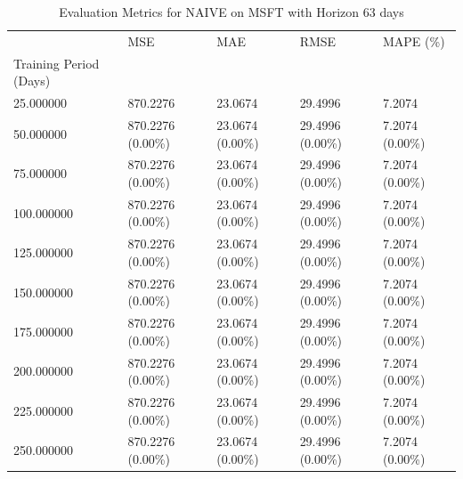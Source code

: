 \begin{table}
\caption{Evaluation Metrics for NAIVE on MSFT with Horizon 63 days}
\label{tab:naive_MSFT_h63_metrics}
\begin{tabular}{lllll}
\toprule
 & MSE & MAE & RMSE & MAPE (\%) \\
Training Period (Days) &  &  &  &  \\
\midrule
25.000000 & 870.2276 & 23.0674 & 29.4996 & 7.2074 \\
50.000000 & 870.2276 (0.00\%) & 23.0674 (0.00\%) & 29.4996 (0.00\%) & 7.2074 (0.00\%) \\
75.000000 & 870.2276 (0.00\%) & 23.0674 (0.00\%) & 29.4996 (0.00\%) & 7.2074 (0.00\%) \\
100.000000 & 870.2276 (0.00\%) & 23.0674 (0.00\%) & 29.4996 (0.00\%) & 7.2074 (0.00\%) \\
125.000000 & 870.2276 (0.00\%) & 23.0674 (0.00\%) & 29.4996 (0.00\%) & 7.2074 (0.00\%) \\
150.000000 & 870.2276 (0.00\%) & 23.0674 (0.00\%) & 29.4996 (0.00\%) & 7.2074 (0.00\%) \\
175.000000 & 870.2276 (0.00\%) & 23.0674 (0.00\%) & 29.4996 (0.00\%) & 7.2074 (0.00\%) \\
200.000000 & 870.2276 (0.00\%) & 23.0674 (0.00\%) & 29.4996 (0.00\%) & 7.2074 (0.00\%) \\
225.000000 & 870.2276 (0.00\%) & 23.0674 (0.00\%) & 29.4996 (0.00\%) & 7.2074 (0.00\%) \\
250.000000 & 870.2276 (0.00\%) & 23.0674 (0.00\%) & 29.4996 (0.00\%) & 7.2074 (0.00\%) \\
\bottomrule
\end{tabular}
\end{table}
